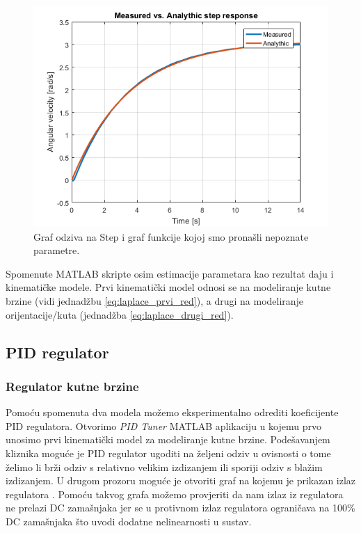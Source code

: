 \documentclass[times, utf8, diplomski, numeric]{templates/template}
\begin{document}
{{{            \begin{figure}[htb]
            \centering
            \includegraphics[width=1.0\textwidth]{other/fittana_funkcija.png}
            \caption{Graf odziva na Step i graf funkcije kojoj smo pronašli nepoznate parametre.}
            \label{fig:fittana_funkcija}
            \end{figure}

            Spomenute MATLAB skripte osim estimacije parametara kao rezultat daju i kinematičke modele. Prvi kinematički model odnosi se na modeliranje kutne brzine (vidi jednadžbu \ref{eq:laplace_prvi_red}), a drugi na modeliranje orijentacije/kuta (jednadžba \ref{eq:laplace_drugi_red}).
        }
    
        \subsection{PID regulator}{
        \label{subsection:pid_regulator}


            \subsubsection{Regulator kutne brzine}{
                Pomoću spomenuta dva modela možemo eksperimentalno odrediti koeficijente PID regulatora. Otvorimo \emph{PID Tuner} MATLAB aplikaciju \cite{pid_tuner} u kojemu prvo unosimo prvi kinematički model za modeliranje kutne brzine. Podešavanjem kliznika moguće je PID regulator ugoditi na željeni odziv u ovisnosti o tome želimo li brži odziv s relativno velikim izdizanjem  ili sporiji odziv s blažim izdizanjem. U drugom prozoru moguće je otvoriti graf na kojemu je prikazan izlaz regulatora . Pomoću takvog grafa možemo provjeriti da nam izlaz iz regulatora ne prelazi DC zamašnjaka jer se u protivnom izlaz regulatora ograničava na 100\% DC zamašnjaka što uvodi dodatne nelinearnosti u sustav. 
            }

}}}
\end{document}
